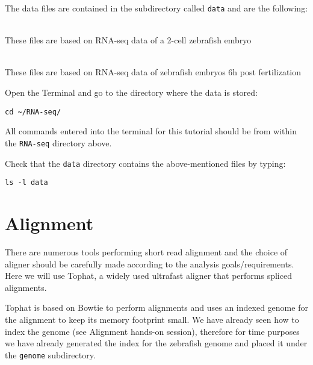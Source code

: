 The data files are contained in the subdirectory called \texttt{data} and are
the following:
\begin{description}[style=multiline,labelindent=1.5cm,align=left,leftmargin=2.5cm]
  \item[\texttt{2cells\_1.fastq} and \texttt{2cells\_2.fastq}] \hfill\\
 These files are based on RNA-seq data of a 2-cell zebrafish embryo
  \item[\texttt{6h\_1.fastq} and \texttt{6h\_2.fastq}] \hfill\\
 These files are based on RNA-seq data of zebrafish embryos 6h post
 fertilization
\end{description}

\begin{steps}
Open the Terminal and go to the directory where the data is stored:
\begin{lstlisting}
cd ~/RNA-seq/
\end{lstlisting}
\end{steps}

\begin{warning}
  All commands entered into the terminal for this tutorial should be from within the
  \texttt{RNA-seq} directory above.
\end{warning}

\begin{steps}
Check that the \texttt{data} directory contains the above-mentioned files by typing:
\begin{lstlisting}
ls -l data
\end{lstlisting}
\end{steps}

\section{Alignment}
There are numerous tools performing short read alignment and the choice of aligner
should be carefully made according to the analysis goals/requirements. Here we will
use Tophat, a widely used ultrafast aligner that performs spliced alignments.

Tophat is based on Bowtie to perform alignments and uses an indexed genome for the
alignment to keep its memory footprint small. We have already seen how to index the
genome (see Alignment hands-on session), therefore for time purposes we have already
generated the index for the zebrafish genome and placed it under the \texttt{genome}
subdirectory.

